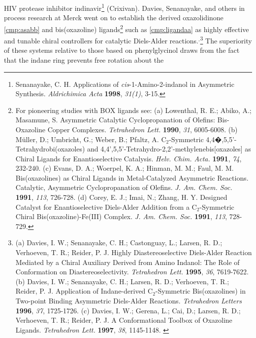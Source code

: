 HIV protease inhibitor indinavir\footnote{{\frenchspacing Senanayake, C. H. Applications of \textit{cis}-1-Amino-2-indanol
in Asymmetric Synthesis. \textit{Aldrichimica Acta} \textbf{1998}, \textit{31(1)}, 3-15.}}
(Crixivan\regtm). Davies, Senanayake, and others in process research at Merck went on to establish
the derived oxazolidinone \ref{cmp:asabb} and bis(oxazoline) ligands\footnote{For pioneering
studies with BOX ligands see: (a) {\frenchspacing Lowenthal, R. E.; Abiko, A.; Masamune, S.
Asymmetric Catalytic Cyclopropanation of Olefins: Bis-Oxazoline Copper Complexes. \textit{Tetrahedron Lett.}
\textbf{1990}, \textit{31}, 6005-6008.} (b) {\frenchspacing M\"{u}ller, D.; Umbricht, G.; Weber, B.;
Pfaltz, A. C$_2$-Symmetric 4,4�,5,5'-Tetrahydrobi(oxazoles) and
4,4',5,5'-Tetrahydro-2,2'-methylenebis[oxazoles] as Chiral Ligands for Enantioselective Catalysis.
\textit{Helv. Chim. Acta.} \textbf{1991}, \textit{74}, 232-240.} (c) {\frenchspacing Evans, D. A.;
Woerpel, K. A.; Hinman, M. M.; Faul, M. M. Bis(oxazolines) as Chiral Ligands in Metal-Catalyzed
Asymmetric Reactions. Catalytic, Asymmetric Cyclopropanation of Olefins. \textit{J. Am. Chem. Soc.}
\textbf{1991}, \textit{113}, 726-728.} (d) {\frenchspacing Corey, E. J.; Imai, N.; Zhang, H. Y.
Designed Catalyst for Enantioselective Diels-Alder Addition from a C$_2$-Symmetric Chiral
Bis(oxazoline)-Fe(III) Complex. \textit{J. Am. Chem. Soc.} \textbf{1991}, \textit{113}, 728-729.}}
such as \ref{cmp:ligandaa} as highly effective and tunable chiral controllers for catalytic
Diels-Alder reactions.$^,$\footnote{(a) {\frenchspacing Davies, I.
W.; Senanayake, C. H.; Castonguay, L.; Larsen, R. D.; Verhoeven, T. R.; Reider, P. J. Highly
Diastereoselective Diels-Alder Reaction Mediated by a Chiral Auxiliary Derived from Amino Indanol:
The Role of Conformation on Diastereoselectivity. \textit{Tetrahedron Lett.} \textbf{1995},
\textit{36}, 7619-7622.} (b) {\frenchspacing Davies, I. W.; Senanayake, C. H.; Larsen, R. D.;
Verhoeven, T. R.; Reider, P. J. Application of Indane-derived C$_2$-Symmetric Bis(oxazolines) in
Two-point Binding Asymmetric Diels-Alder Reactions. \textit{Tetrahedron Letters} \textbf{1996},
\textit{37}, 1725-1726.} (c) {\frenchspacing Davies, I. W.; Gerena, L.; Cai, D.; Larsen, R. D.;
Verhoeven, T. R.; Reider, P. J. A Conformational Toolbox of Oxazoline Ligands. \textit{Tetrahedron
Lett.} \textbf{1997}, \textit{38}, 1145-1148.} \label{ref:asdaviesbiglist}} The superiority of these
systems relative to those based on phenylglycinol draws from the fact that the indane ring prevents free rotation about the
